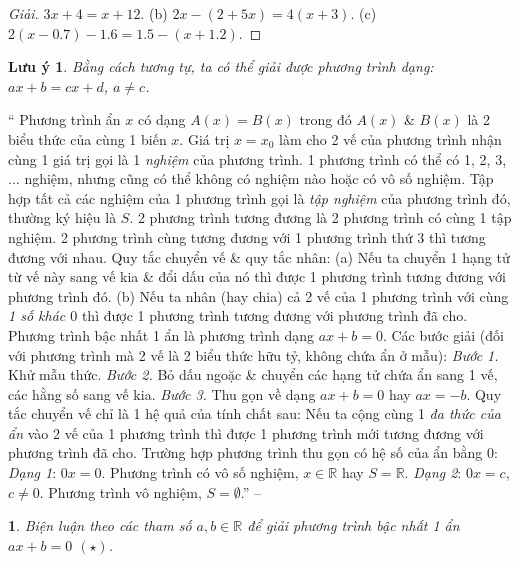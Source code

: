 \documentclass{article}
\newtheorem{baitoan}{}
\newtheorem{luuy}{Lưu ý}
\begin{document}
\begin{proof}[Giải]
	$3x + 4 = x + 12$. (b) $2x - (2 + 5x) = 4(x + 3)$. (c) $2(x - 0.7) - 1.6 = 1.5 - (x + 1.2)$.
\end{proof}

\begin{luuy}
	Bằng cách tương tự, ta có thể giải được phương trình dạng: $ax + b = cx + d$, $a\ne c$.
\end{luuy}

\noindent`` Phương trình ẩn $x$ có dạng $A(x) = B(x)$ trong đó $A(x)$ \& $B(x)$ là 2 biểu thức của cùng 1 biến $x$. Giá trị $x = x_0$ làm cho 2 vế của phương trình nhận cùng 1 giá trị gọi là 1 \textit{nghiệm} của phương trình. 1 phương trình có thể có 1, 2, 3, $\ldots$ nghiệm, nhưng cũng có thể không có nghiệm nào hoặc có vô số nghiệm. Tập hợp tất cả các nghiệm của 1 phương trình gọi là \textit{tập nghiệm} của phương trình đó, thường ký hiệu là $S$.  2 phương trình tương đương là 2 phương trình có cùng 1 tập nghiệm. 2 phương trình cùng tương đương với 1 phương trình thứ 3 thì tương đương với nhau.  Quy tắc chuyển vế \& quy tắc nhân: (a) Nếu ta chuyển 1 hạng tử từ vế này sang vế kia \& đổi dấu của nó thì được 1 phương trình tương đương với phương trình đó. (b) Nếu ta nhân (hay chia) cả 2 vế của 1 phương trình với cùng \textit{1 số khác $0$} thì được 1 phương trình tương đương với phương trình đã cho.  Phương trình bậc nhất 1 ẩn là phương trình dạng $ax + b = 0$. Các bước giải (đối với phương trình mà 2 vế là 2 biểu thức hữu tỷ, không chứa ẩn ở mẫu): \textit{Bước 1.} Khử mẫu thức. \textit{Bước 2.} Bỏ dấu ngoặc \& chuyển các hạng tử chứa ẩn sang 1 vế, các hằng số sang vế kia. \textit{Bước 3.} Thu gọn về dạng $ax + b = 0$ hay $ax = -b$.  Quy tắc chuyển vế chỉ là 1 hệ quả của tính chất sau: Nếu ta cộng cùng 1 \textit{đa thức của ẩn} vào 2 vế của 1 phương trình thì được 1 phương trình mới tương đương với phương trình đã cho.  Trường hợp phương trình thu gọn có hệ số của ẩn bằng $0$: \textit{Dạng 1}: $0x = 0$. Phương trình có vô số nghiệm, $x\in\mathbb{R}$ hay $S = \mathbb{R}$. \textit{Dạng 2}: $0x = c$, $c\ne 0$. Phương trình vô nghiệm, $S = \emptyset$.'' -- \cite[Chap. III, \S1, pp. 53--54]{Tuyen_Toan_8}

\begin{baitoan}
	Biện luận theo các tham số $a,b\in\mathbb{R}$ để giải phương trình bậc nhất 1 ẩn $ax + b = 0$ $(\star)$.
\end{baitoan}
\end{document}
